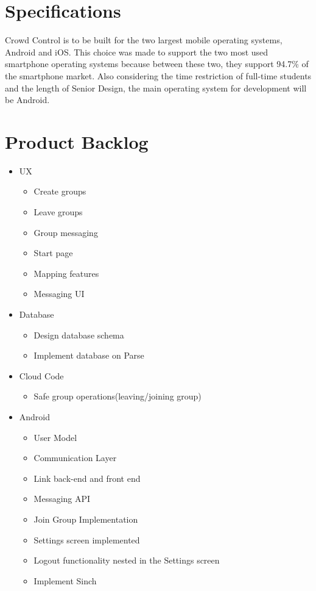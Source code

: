\section{Specifications}  
Crowd Control is to be built for the two largest mobile operating systems, Android and iOS.  This choice was made to support the two most used smartphone operating systems because between these two, they support 94.7\% of the smartphone market.  Also considering the time restriction of full-time students and the length of Senior Design, the main operating system for development will be Android.

\section{Product Backlog}
\begin{itemize}
\item UX
\begin{itemize}
	\item Create groups
	\item Leave groups
	\item Group messaging
	\item Start page
	\item Mapping features
	\item Messaging UI
\end{itemize}
\item Database
\begin{itemize}
	\item Design database schema
	\item Implement database on Parse
\end{itemize}
\item Cloud Code
\begin{itemize}
	\item Safe group operations(leaving/joining group)
\end{itemize}
\item Android
\begin{itemize}
	\item User Model
	\item Communication Layer
	\item Link back-end and front end
	\item Messaging API
	\item Join Group Implementation
	\item Settings screen implemented
	\item Logout functionality nested in the Settings screen
	\item Implement Sinch

\end{itemize}
\end{itemize}
